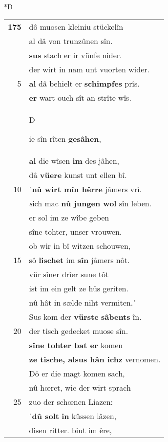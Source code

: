 \documentclass[8pt,a4paper,notitlepage]{article}
\begin{document}
\begin{table}[ht]
\begin{minipage}[t]{0.5\linewidth}
\small
\begin{center}*D
\end{center}
\begin{tabular}{rl}
\textbf{175} & dô muosen kleiniu stückelîn\\ 
 & al dâ von trunzûnen sîn.\\ 
 & \textbf{sus} stach er ir vünfe nider.\\ 
 & der wirt in nam unt vuorten wider.\\ 
5 & \textbf{al} dâ behielt er \textbf{schimpfes} prîs.\\ 
 & \textbf{er} wart ouch sît an strîte wîs.\\ 
 & \begin{large}D\end{large}ie sîn rîten \textbf{gesâhen},\\ 
 & \textbf{al} die wîsen \textbf{im} des jâhen,\\ 
 & dâ \textbf{vüere} kunst unt ellen bî.\\ 
10 & "\textbf{nû wirt mîn hêrre} jâmers vrî.\\ 
 & \textit{s}ich mac \textbf{nû jungen wol} sîn leben.\\ 
 & er sol im ze wîbe geben\\ 
 & sîne tohter, unser vrouwen.\\ 
 & ob wir in bî witzen schouwen,\\ 
15 & sô \textbf{lischet} im \textbf{sîn} jâmers nôt.\\ 
 & vür sîner drîer sune tôt\\ 
 & ist im ein gelt ze hûs geriten.\\ 
 & nû hât in sælde niht vermiten."\\ 
 & Sus kom der \textbf{vürste} \textbf{sâbents} în.\\ 
20 & der tisch gedecket muose sîn.\\ 
 & \textbf{sîne tohter bat er} komen\\ 
 & \textbf{ze tische, alsus hân ichz} vernomen.\\ 
 & Dô er die magt komen sach,\\ 
 & nû hœret, wie der wirt sprach\\ 
25 & zuo der schœnen Liazen:\\ 
 & "\textbf{dû solt} \textbf{in} küssen lâzen,\\ 
 & disen ritter. biut im êre,\\ 

\end{tabular}
\end{minipage}
\end{table}
\end{document}
